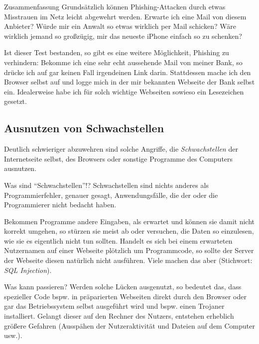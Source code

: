 \documentclass[hyperref={colorlinks,linkcolor=white}, utf8]{beamer}
\begin{document}
	\begin{frame}{Zusammenfassung}
		Grundsätzlich können Phishing-Attacken durch etwas Misstrauen im Netz leicht abgewehrt werden. Erwarte ich eine Mail von diesem Anbieter? Würde mir ein Anwalt so etwas wirklich per Mail schicken? Wäre wirklich jemand so großzügig, mir das neueste iPhone einfach so zu schenken?
		
		Ist dieser Test bestanden, so gibt es eine weitere Möglichkeit, Phishing zu verhindern: Bekomme ich eine sehr echt aussehende Mail von meiner Bank, so drücke ich auf gar keinen Fall irgendeinen Link darin. Stattdessen mache ich den Browser selbst auf und logge mich in der mir bekannten Webseite der Bank selbst ein. Idealerweise habe ich für solch wichtige Webseiten sowieso ein Lesezeichen gesetzt.
	\end{frame}
	
	\subsection{Ausnutzen von Schwachstellen}
	\begin{frame}
		Deutlich schwieriger abzuwehren sind solche Angriffe, die \emph{Schwachstellen} der Internetseite selbst, des Browsers oder sonstige Programme des Computers ausnutzen.
	\end{frame}

	\begin{frame}{Was sind \enquote{Schwachstellen}!?}
		Schwachstellen sind nichts anderes als Programmierfehler, genauer gesagt, Anwendungsfälle, die der oder die Programmierer nicht bedacht haben. 
		
		Bekommen Programme andere Eingaben, als erwartet und können sie damit nicht korrekt umgehen, so stürzen sie meist ab oder versuchen, die Daten so einzulesen, wie sie es eigentlich nicht tun sollten. Handelt es sich bei einem erwarteten Nutzernamen auf einer Webseite plötzlich um Programmcode, so sollte der Server der Webseite diesen natürlich nicht ausführen. Viele machen das aber (Stichwort: \emph{SQL Injection}).		
	\end{frame}

	\begin{frame}{Was kann passieren?}
		Werden solche Lücken ausgenutzt, so bedeutet das, dass spezieller Code bspw. in präparierten Webseiten direkt durch den Browser oder gar das Betriebssystem selbst ausgeführt wird und bspw. einen Trojaner installiert. Gelangt dieser auf den Rechner des Nutzers, entstehen erheblich größere Gefahren (Ausspähen der Nutzeraktivität und Dateien auf dem Computer usw.).
	\end{frame}
\end{document}
